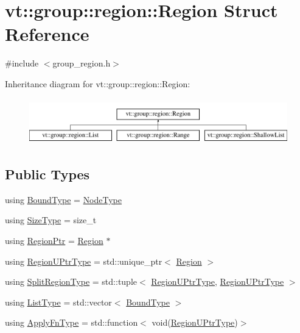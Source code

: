 \hypertarget{structvt_1_1group_1_1region_1_1_region}{}\section{vt\+:\+:group\+:\+:region\+:\+:Region Struct Reference}
\label{structvt_1_1group_1_1region_1_1_region}


{\ttfamily \#include $<$group\+\_\+region.\+h$>$}

Inheritance diagram for vt\+:\+:group\+:\+:region\+:\+:Region\+:\begin{figure}[H]
\begin{center}
\leavevmode
\includegraphics[height=2.000000cm]{structvt_1_1group_1_1region_1_1_region}
\end{center}
\end{figure}
\subsection*{Public Types}
\begin{DoxyCompactItemize}
\item 
using \hyperlink{structvt_1_1group_1_1region_1_1_region_abf426ff85bed72c1c6524fad6a9f1751}{Bound\+Type} = \hyperlink{namespacevt_a866da9d0efc19c0a1ce79e9e492f47e2}{Node\+Type}
\item 
using \hyperlink{structvt_1_1group_1_1region_1_1_region_a9bb381adf31111aae34dbc644bad6c1f}{Size\+Type} = size\+\_\+t
\item 
using \hyperlink{structvt_1_1group_1_1region_1_1_region_a79f6795196ce4fd9fff863cf2a5bf30d}{Region\+Ptr} = \hyperlink{structvt_1_1group_1_1region_1_1_region}{Region} $\ast$
\item 
using \hyperlink{structvt_1_1group_1_1region_1_1_region_ae5f42cf159116a3cf8bd65423eb01037}{Region\+U\+Ptr\+Type} = std\+::unique\+\_\+ptr$<$ \hyperlink{structvt_1_1group_1_1region_1_1_region}{Region} $>$
\item 
using \hyperlink{structvt_1_1group_1_1region_1_1_region_ab8d05c0978c7f38292a9ed5a15498a4b}{Split\+Region\+Type} = std\+::tuple$<$ \hyperlink{structvt_1_1group_1_1region_1_1_region_ae5f42cf159116a3cf8bd65423eb01037}{Region\+U\+Ptr\+Type}, \hyperlink{structvt_1_1group_1_1region_1_1_region_ae5f42cf159116a3cf8bd65423eb01037}{Region\+U\+Ptr\+Type} $>$
\item 
using \hyperlink{structvt_1_1group_1_1region_1_1_region_a4e35b2fc6dca06aca0b7bc0e19b35c5a}{List\+Type} = std\+::vector$<$ \hyperlink{structvt_1_1group_1_1region_1_1_region_abf426ff85bed72c1c6524fad6a9f1751}{Bound\+Type} $>$
\item 
using \hyperlink{structvt_1_1group_1_1region_1_1_region_a7c9e99b1157d2fe2f3e6fc36a1463a96}{Apply\+Fn\+Type} = std\+::function$<$ void(\hyperlink{structvt_1_1group_1_1region_1_1_region_ae5f42cf159116a3cf8bd65423eb01037}{Region\+U\+Ptr\+Type})$>$
\end{DoxyCompactItemize}
